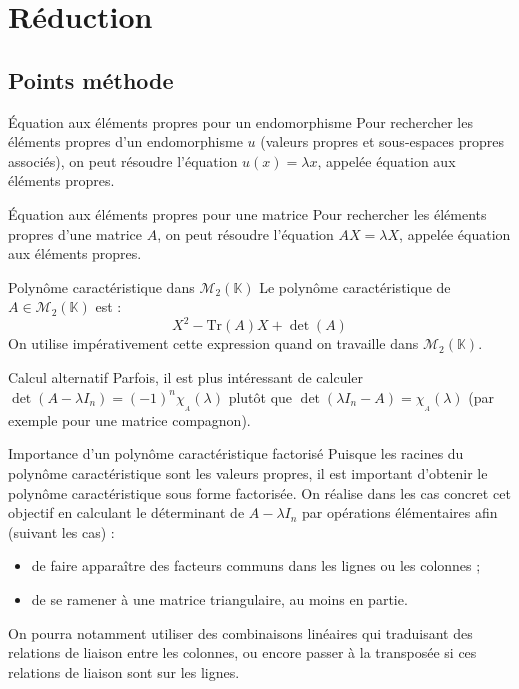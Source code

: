 \documentclass[french]{book}
\newcommand{\K}{\mathbb{K}}
\newcommand{\Tr}{\text{Tr}}
\theoremstyle{plain}
\theoremstyle{definition}
\theoremstyle{remark}
\begin{document}
\chapter{Réduction}
\localtableofcontents
\section{Points méthode}
\begin{PM}{Équation aux éléments propres pour un endomorphisme} Pour rechercher les éléments propres d'un endomorphisme $u$ (valeurs propres et sous-espaces propres associés), on peut résoudre l'équation $u(x)=\lambda x$, appelée équation aux éléments propres.
\end{PM}
\begin{PM}{Équation aux éléments propres pour une matrice} Pour rechercher les éléments propres d'une matrice $A$, on peut résoudre l'équation $AX=\lambda X$, appelée équation aux éléments propres.
\end{PM}
\begin{PM}{Polynôme caractéristique dans $\mathcal{M}_2(\K)$} Le polynôme caractéristique de $A\in\mathcal{M}_2(\K)$ est : $$X^2-\Tr(A)X+\det(A)$$ On utilise impérativement cette expression quand on travaille dans $\mathcal{M}_2(\K)$.
\end{PM}
\begin{PM}{Calcul alternatif} Parfois, il est plus intéressant de calculer $\det(A-\lambda I_n)=(-1)^n\chi_{_A}(\lambda)$ plutôt que $\det(\lambda I_n-A)=\chi_{_A}(\lambda)$ (par exemple pour une matrice compagnon).
\end{PM}
\begin{PM}{Importance d'un polynôme caractéristique factorisé} Puisque les racines du polynôme caractéristique sont les valeurs propres, il est important d'obtenir le polynôme caractéristique sous forme factorisée. On réalise dans les cas concret cet objectif en calculant le déterminant de $A-\lambda I_n$ par opérations élémentaires afin (suivant les cas) :
\begin{itemize}
	\item de faire apparaître des facteurs communs dans les lignes ou les colonnes ;
	\item de se ramener à une matrice triangulaire, au moins en partie.
\end{itemize} On pourra notamment utiliser des combinaisons linéaires qui traduisant des relations de liaison entre les colonnes, ou encore passer à la transposée si ces relations de liaison sont sur les lignes.
\end{PM}
\end{document}
